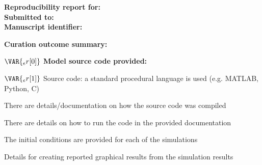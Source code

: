 \documentclass{article}
\date{}
\begin{document}
\noindent
\textbf{Reproducibility report for:} 
\\
\textbf{Submitted to:} 
\\
\textbf{Manuscript identifier:} 

\bigskip
\noindent
\textbf{Curation outcome summary:} 
\vspace{5mm}
\begin{tcolorbox}[breakable,height fill,
colback=white,
arc=0pt,
outer arc=0pt,
colframe=white,
top=2mm,
toptitle=2mm,
bottomtitle=2mm,
colbacktitle=white!80!black,
colframe=black,
coltitle=black, 
title= \textbf{Box 1:} Criteria for repeatability and reproducibility]
$\VAR{_er[0]}$ \textbf{Model source code provided:}
\begin{todolist}
  \item [$\VAR{_er[1]}$] Source code: a standard procedural language is used (e.g. MATLAB, Python, C)
  \begin{todolist}
      \item[\VAR{_er[2]}] There are details/documentation on how the source code was compiled
      \item[\VAR{_er[3]}] There are details on how to run the code in the provided documentation
      \item[\VAR{_er[4]}] The initial conditions are provided for each of the simulations
      \item[\VAR{_er[5]}] Details for creating reported graphical results from the simulation results
  \end{todolist}
  

\end{todolist}
\end{tcolorbox}
\end{document}
